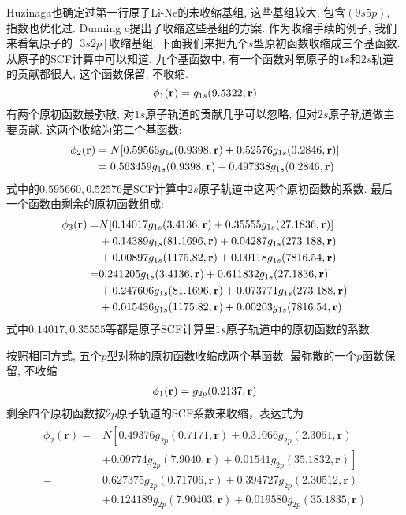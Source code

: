 Huzinaga也确定过第一行原子Li-Ne的未收缩基组, 这些基组较大, 包含$(9s5p)$, 指数也优化过. Dunning c提出了收缩这些基组的方案. 作为收缩手续的例子, 我们来看氧原子的$[3s2p]$收缩基组. 下面我们来把九个$s$型原初函数收缩成三个基函数. 从原子的SCF计算中可以知道, 九个基函数中, 有一个函数对氧原子的$1s$和$2s$轨道的贡献都很大, 这个函数保留, 不收缩.
\begin{equation}
\label{3.290}
\phi_1(\mathbf{r})=g_{1s}(9.5322,\mathbf{r})
\end{equation} 
有两个原初函数最弥散, 对$1s$原子轨道的贡献几乎可以忽略, 但对$2s$原子轨道做主要贡献. 这两个收缩为第二个基函数:
\begin{align}
\label{3.291}
\phi_2(\mathbf{r}) & = N[0.59566g_{1s}(0.9398,\mathbf{r}) + 0.52576 g_{1s}(0.2846,\mathbf{r})]\notag\\
			 & = 0.563459 g_{1s}(0.9398,\mathbf{r}) + 0.497338 g_{1s}(0.2846,\mathbf{r})
\end{align}
式中的$0.595660,0.52576$是SCF计算中$2s$原子轨道中这两个原初函数的系数. 最后一个函数由剩余的原初函数组成:
\begin{align}
\phi_3(\mathbf{r}) = &   N[0.14017g_{1s}(3.4136,\mathbf{r}) + 0.35555g_{1s}(27.1836,\mathbf{r})] \notag\\
               & + 0.14389g_{1s}(81.1696,\mathbf{r}) + 0.04287 g_{1s}(273.188,\mathbf{r}) \notag\\
               & + 0.00897g_{1s}(1175.82,\mathbf{r}) + 0.00118g_{1s}(7816.54,\mathbf{r}) \notag\\
             = & 0.241205g_{1s}(3.4136,\mathbf{r}) + 0.611832g_{1s}(27.1836,\mathbf{r})] \notag\\
             & + 0.247606g_{1s}(81.1696,\mathbf{r}) + 0.073771 g_{1s}(273.188,\mathbf{r}) \notag\\
             & + 0.015436g_{1s}(1175.82,\mathbf{r}) + 0.00203g_{1s}(7816.54,\mathbf{r})\\
\end{align}
式中$0.14017, 0.35555$等都是原子SCF计算里$1s$原子轨道中的原初函数的系数.

按照相同方式, 五个$p$型对称的原初函数收缩成两个基函数. 最弥散的一个$p$函数保留, 不收缩
\begin{align}
\phi_1(\mathbf{r}) = g_{2p}(0.2137,\mathbf{r})
\end{align}
剩余四个原初函数按$2p$原子轨道的SCF系数来收缩，表达式为
\begin{align}
\begin{aligned}
	\phi_{2}(\mathbf{r})=& N\left[0.49376 g_{2 p}(0.7171, \mathbf{r})+0.31066 g_{2 p}(2.3051, \mathbf{r})\right.\\
	&\left.+0.09774 g_{2 p}(7.9040, \mathbf{r})+0.01541 g_{2 p}(35.1832, \mathbf{r})\right] \\
	=& 0.627375 g_{2 p}(0.71706, \mathbf{r})+0.394727 g_{2 p}(2.30512, \mathbf{r}) \\
	&+0.124189 g_{2 p}(7.90403, \mathbf{r})+0.019580 g_{2 p}(35.1835, \mathbf{r})
\end{aligned}
\end{align}

